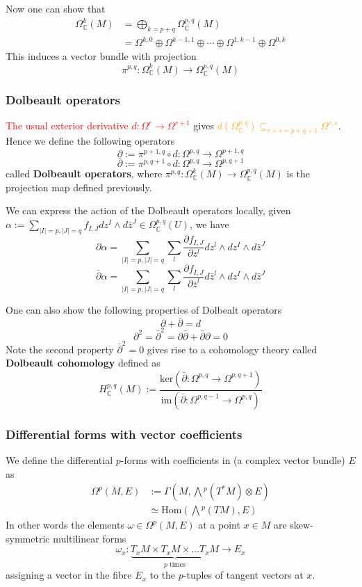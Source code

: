 \documentclass[a4paper]{article}
\theoremstyle{definition} \newtheorem*{definition}{Definition}
\theoremstyle{definition} \newtheorem*{definitions}{Definitions}
\theoremstyle{plain} \newtheorem{theorem}{Theorem}[section]
\theoremstyle{plain} \newtheorem{proposition}[theorem]{Proposition}
\theoremstyle{plain} \newtheorem{corollary}[theorem]{Corollary}
\theoremstyle{plain} \newtheorem{lemma}[theorem]{Lemma}
\theoremstyle{plain} \newtheorem{example}[theorem]{Example}
\newcommand{\checkCorrect}[1]{\textcolor{red}{#1}}
\newcommand{\understandBetter}[1]{\textcolor{orange}{#1}}
\newcommand{\defn}[1]{\textbf{#1}}
\newcommand{\complexnos}{\mathbb{C}}
\newcommand{\Hom}{\text{Hom}}
\begin{document}
Now one can show that
\begin{align*}
\Omega^k_\complexnos(M) & =\bigoplus_{k=p+q} \Omega^{p, q}_\complexnos (M) \\
& = \Omega^{k, 0}\oplus\Omega^{k-1, 1}\oplus \cdots \oplus \Omega^{1, k-1}\oplus \Omega^{0, k}
\end{align*}
This induces a vector bundle with projection 
$$\pi^{p,q}:\Omega^k_\complexnos (M)\to \Omega^{p, q}_\complexnos(M)$$

\subsubsection{Dolbeault operators}
\checkCorrect{The usual exterior derivative $d:\Omega^r \to \Omega^{r+1}$} gives \understandBetter{$d(\Omega^{p,q}_\complexnos)\subseteq_{r+s=p+q+1} \Omega^{r, s}$}. Hence we define the following operators
$$\partial := \pi^{p+1, q}\circ d:\Omega^{p,q}\to \Omega^{p+1, q}$$
$$\bar{\partial} := \pi^{p, q+1}\circ d:\Omega^{p,q}\to \Omega^{p, q+1}$$
called \defn{Dolbeault operators}, where $\pi^{p, q}:\Omega^k_\complexnos (M)\to \Omega^{p, q}_\complexnos(M)$ is the projection map defined previously. 

We can express the action of the Dolbeault operators locally, given $\alpha := \sum_{|I|=p, |J|=q} f_{I,J} dz^I \wedge d\bar{z}^J \in \Omega^{p,q}_\complexnos(U)$, we have
$$\partial \alpha = \sum_{|I|=p, |J|=q} \sum_l \frac{\partial f_{I,J}}{\partial z^l} dz^l\wedge dz^I \wedge d\bar{z}^J$$
$$\bar{\partial} \alpha = \sum_{|I|=p, |J|=q} \sum_l \frac{\partial f_{I,J}}{\partial \bar{z}^l} d\bar{z}^l\wedge dz^I \wedge d\bar{z}^J$$

One can also show the following properties of Dolbealt operators
$$\partial +\bar{\partial} = d$$
$$\partial^2 = \bar{\partial}^2 = \partial\bar{\partial} + \bar{\partial}\partial = 0 $$
Note the second property $\bar{\partial}^2=0$ gives rise to a cohomology theory called \defn{Dolbeault cohomology} defined as
$$H^{p,q}_\complexnos (M) := \frac{\text{ker}(\bar{\partial}:\Omega^{p,q}\to \Omega^{p, q+1})}{\text{im}(\bar{\partial}:\Omega^{p,q-1}\to \Omega^{p, q})}$$

\subsubsection{Differential forms with vector coefficients}
We define the differential $p$-forms with coefficients in (a complex vector bundle) $E$ as 
\begin{align*}
\Omega^p(M, E) & :=\Gamma(M, \bigwedge {}^p(T^\ast M) \otimes E) \\
& \simeq \Hom(\bigwedge {}^p (TM), E)
\end{align*}
In other words the elements $\omega\in \Omega^p(M, E)$ at a point $x\in M$ are skew-symmetric multilinear forms 
$$\omega_x:\underbrace{T_xM\times T_xM\times \ldots T_xM}_{p \text{ times}} \to E_x$$
assigning a vector in the fibre $E_x$ to the $p$-tuples of tangent vectors at $x$. 
\end{document}
